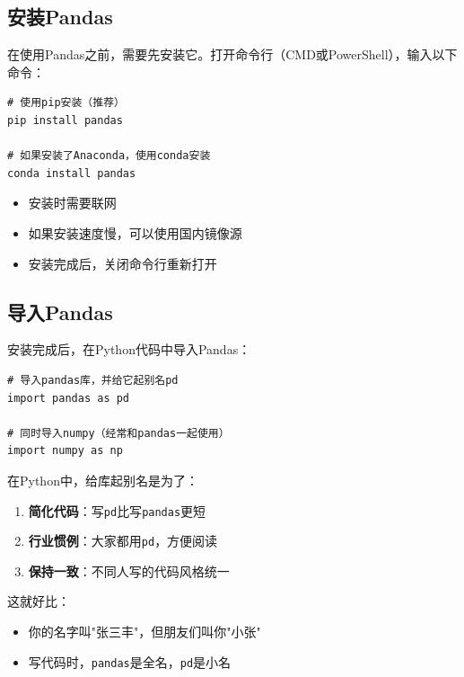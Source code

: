 \documentclass[12pt,a4paper]{article}
\begin{document}
\subsection{安装Pandas}

在使用Pandas之前，需要先安装它。打开命令行（CMD或PowerShell），输入以下命令：

\begin{lstlisting}[caption={安装Pandas}]
# 使用pip安装（推荐）
pip install pandas

# 如果安装了Anaconda，使用conda安装
conda install pandas
\end{lstlisting}

\begin{tipbox}[安装小贴士]
\begin{itemize}
    \item 安装时需要联网
    \item 如果安装速度慢，可以使用国内镜像源
    \item 安装完成后，关闭命令行重新打开
\end{itemize}
\end{tipbox}

\subsection{导入Pandas}

安装完成后，在Python代码中导入Pandas：

\begin{lstlisting}[caption={导入Pandas}]
# 导入pandas库，并给它起别名pd
import pandas as pd

# 同时导入numpy（经常和pandas一起使用）
import numpy as np
\end{lstlisting}

\begin{knowledgebox}
在Python中，给库起别名是为了：
\begin{enumerate}
    \item \textbf{简化代码}：写\texttt{pd}比写\texttt{pandas}更短
    \item \textbf{行业惯例}：大家都用\texttt{pd}，方便阅读
    \item \textbf{保持一致}：不同人写的代码风格统一
\end{enumerate}

这就好比：
\begin{itemize}
    \item 你的名字叫"张三丰"，但朋友们叫你"小张"
    \item 写代码时，\texttt{pandas}是全名，\texttt{pd}是小名
\end{itemize}
\end{knowledgebox}
\end{document}
